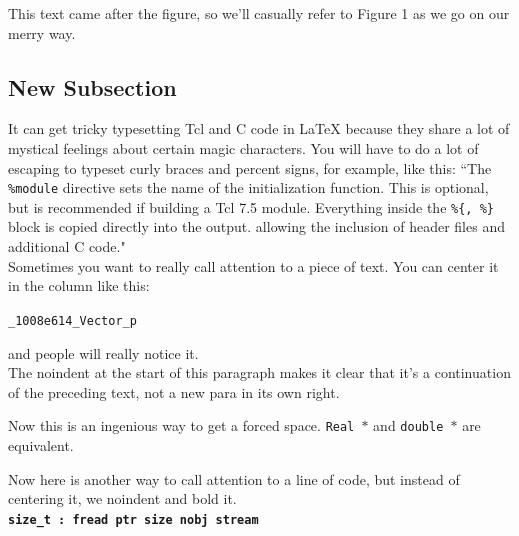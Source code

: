 \documentclass[letterpaper,twocolumn,10pt]{article}
\begin{document}

This text came after the figure, so we'll casually refer to Figure 1
as we go on our merry way.

\subsection{New Subsection}

It can get tricky typesetting Tcl and C code in LaTeX because they share
a lot of mystical feelings about certain magic characters.  You
will have to do a lot of escaping to typeset curly braces and percent
signs, for example, like this:
``The {\tt \%module} directive
sets the name of the initialization function.  This is optional, but is
recommended if building a Tcl 7.5 module.
Everything inside the {\tt \%\{, \%\}}
block is copied directly into the output. allowing the inclusion of
header files and additional C code." \\

Sometimes you want to really call attention to a piece of text.  You
can center it in the column like this:
\begin{center}
{\tt \_1008e614\_Vector\_p}
\end{center}
and people will really notice it.\\

\noindent
The noindent at the start of this paragraph makes it clear that it's
a continuation of the preceding text, not a new para in its own right.


Now this is an ingenious way to get a forced space.
{\tt Real~$*$} and {\tt double~$*$} are equivalent. 

Now here is another way to call attention to a line of code, but instead
of centering it, we noindent and bold it.\\

\noindent
{\bf \tt size\_t : fread ptr size nobj stream } \\
\end{document}
